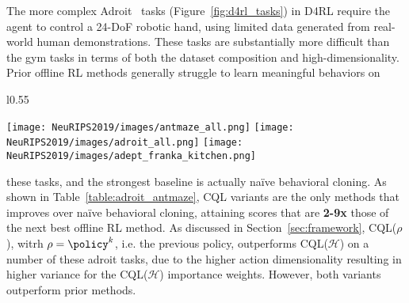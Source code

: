 The more complex Adroit~\citep{rajeswaran2018dapg} tasks (Figure~\ref{fig:d4rl_tasks}) in D4RL require the agent to control a 24-DoF robotic hand, using limited data generated from real-world human demonstrations. These tasks are substantially more difficult than the gym tasks in terms of both the dataset composition and high-dimensionality. Prior offline RL methods generally struggle to learn meaningful behaviors on 
\begin{wrapfigure}{l}{0.55\textwidth}
  \vspace{-18pt}
  \begin{center}
    \texttt{[image: NeuRIPS2019/images/antmaze\_all.png]}
    \texttt{[image: NeuRIPS2019/images/adroit\_all.png]}
    \texttt{[image: NeuRIPS2019/images/adept\_franka\_kitchen.png]}
  \end{center}
  \vspace{-7pt}
  \caption{{\small Evaluation tasks in the D4RL suite (from L to R: AntMaze navigation, Adroit, Franka Kitchen tasks).}}
  \vspace{-14pt}
 \label{fig:d4rl_tasks}
\end{wrapfigure}
these tasks, and the strongest baseline is actually na\"{i}ve behavioral cloning. As shown in Table~\ref{table:adroit_antmaze}, CQL variants are the only methods that improves over na\"{i}ve behavioral
cloning, attaining scores that are \textbf{2-9x} those of the next best offline RL method. As discussed in Section~\ref{sec:framework}, CQL($\rho$), witrh $\rho = \policy^{k}$, i.e. the previous policy, outperforms CQL($\mathcal{H}$) on a number of these adroit tasks, due to the higher action dimensionality resulting in higher variance for the CQL($\mathcal{H}$) importance weights. However, both variants outperform prior methods.


